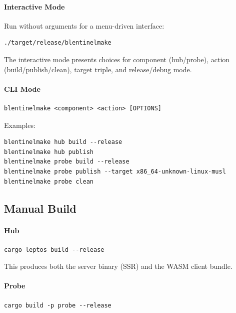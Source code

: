 \documentclass[12pt]{report}
\begin{document}
\paragraph{Interactive Mode} Run without arguments for a menu-driven
interface:

\begin{lstlisting}
./target/release/blentinelmake
\end{lstlisting}

The interactive mode presents choices for component (hub/probe), action
(build/publish/clean), target triple, and release/debug mode.

\paragraph{CLI Mode}

\begin{lstlisting}
blentinelmake <component> <action> [OPTIONS]
\end{lstlisting}

Examples:

\begin{lstlisting}
blentinelmake hub build --release
blentinelmake hub publish
blentinelmake probe build --release
blentinelmake probe publish --target x86_64-unknown-linux-musl
blentinelmake probe clean
\end{lstlisting}

\subsection{Manual Build}

\paragraph{Hub}

\begin{lstlisting}
cargo leptos build --release
\end{lstlisting}

This produces both the server binary (SSR) and the WASM client bundle.

\paragraph{Probe}

\begin{lstlisting}
cargo build -p probe --release
\end{lstlisting}
\end{document}
